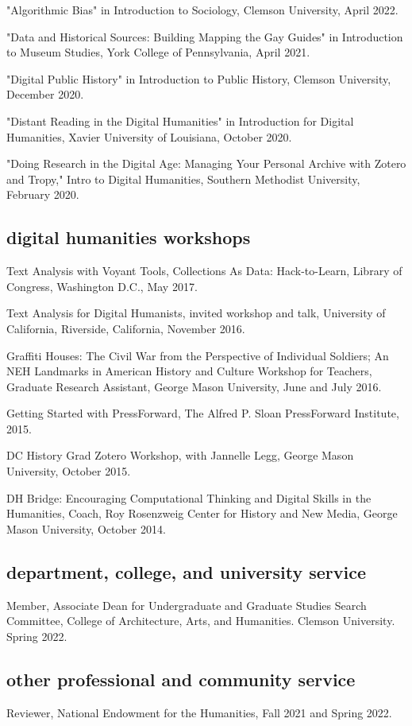 \documentclass[11pt]{article}
\begin{document}
"Algorithmic Bias" in Introduction to Sociology, Clemson University, April 2022.

"Data and Historical Sources: Building Mapping the Gay Guides" in Introduction to Museum Studies, York College of Pennsylvania, April 2021.

"Digital Public History" in Introduction to Public History, Clemson University, December 2020.

"Distant Reading in the Digital Humanities" in Introduction for Digital Humanities, Xavier University of Louisiana, October 2020.

"Doing Research in the Digital Age: Managing Your Personal Archive with Zotero and Tropy," Intro to Digital Humanities, Southern Methodist University, February 2020.

\subsection{digital humanities workshops}
Text Analysis with Voyant Tools, Collections As Data: Hack-to-Learn, Library of Congress, Washington D.C., May 2017.

Text Analysis for Digital Humanists, invited workshop and talk, University of California, Riverside, California, November 2016.

Graffiti Houses: The Civil War from the Perspective of Individual Soldiers; An NEH Landmarks in American History and Culture Workshop for Teachers, Graduate Research Assistant, George Mason University, June and July 2016.

Getting Started with PressForward, The Alfred P. Sloan PressForward Institute, 2015.

DC History Grad Zotero Workshop, with Jannelle Legg, George Mason University, October 2015.

DH Bridge: Encouraging Computational Thinking and Digital Skills in the Humanities, Coach, Roy Rosenzweig Center for History and New Media, George Mason University, October 2014.

\subsection{department, college, and university service}\label{Department, College, and University Service}
Member, Associate Dean for Undergraduate and Graduate Studies Search Committee, College of Architecture, Arts, and Humanities. Clemson University. Spring 2022.

\subsection{other professional and community service}\label{Other Professional and Community Service}
Reviewer, National Endowment for the Humanities, Fall 2021 and Spring 2022.
\end{document}
